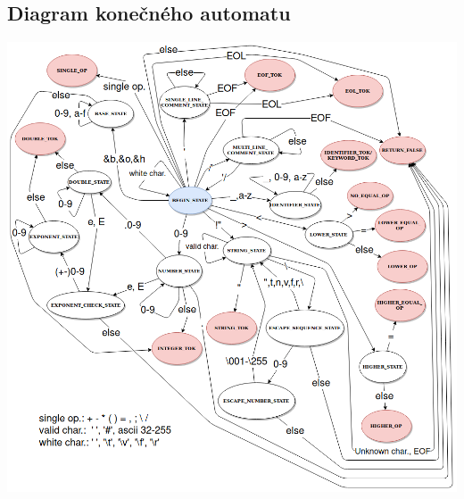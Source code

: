 \documentclass{article}
\begin{document}
        \subsection{Diagram konečného automatu}
            \includegraphics[trim=6cm 0 0 0, width=15cm]{finite_automata.png}
            \newpage
            
\end{document}
